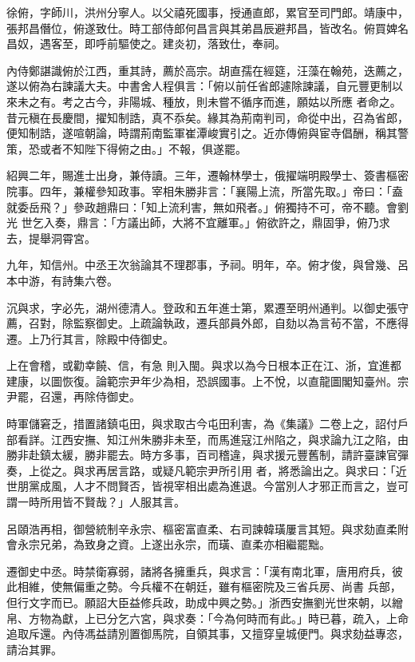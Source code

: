 \begin{pinyinscope}
 徐俯，字師川，洪州分寧人。以父禧死國事，授通直郎，累官至司門郎。靖康中，張邦昌僭位，俯遂致仕。時工部侍郎何昌言與其弟昌辰避邦昌，皆改名。俯買婢名昌奴，遇客至，即呼前驅使之。建炎初，落致仕，奉祠。



 內侍鄭諶識俯於江西，重其詩，薦於高宗。胡直孺在經筵，汪藻在翰苑，迭薦之，遂以俯為右諫議大夫。中書舍人程俱言：「俯以前任省郎遽除諫議，自元豐更制以來未之有。考之古今，非陽城、種放，則未嘗不循序而進，願姑以所應
 者命之。昔元稹在長慶間，擢知制誥，真不忝矣。緣其為荊南判司，命從中出，召為省郎，便知制誥，遂喧朝論，時謂荊南監軍崔潭峻實引之。近亦傳俯與宦寺倡酬，稱其警策，恐或者不知陛下得俯之由。」不報，俱遂罷。



 紹興二年，賜進士出身，兼侍讀。三年，遷翰林學士，俄擢端明殿學士、簽書樞密院事。四年，兼權參知政事。宰相朱勝非言：「襄陽上流，所當先取。」帝曰：「盍就委岳飛？」參政趙鼎曰：「知上流利害，無如飛者。」俯獨持不可，帝不聽。會劉光
 世乞入奏，鼎言：「方議出師，大將不宜離軍。」俯欲許之，鼎固爭，俯乃求去，提舉洞霄宮。



 九年，知信州。中丞王次翁論其不理郡事，予祠。明年，卒。俯才俊，與曾幾、呂本中游，有詩集六卷。



 沉與求，字必先，湖州德清人。登政和五年進士第，累遷至明州通判。以御史張守薦，召對，除監察御史。上疏論執政，遷兵部員外郎，自劾以為言茍不當，不應得遷。上乃行其言，除殿中侍御史。



 上在會稽，或勸幸饒、信，有急
 則入閩。與求以為今日根本正在江、浙，宜進都建康，以圖恢復。論範宗尹年少為相，恐誤國事。上不悅，以直龍圖閣知臺州。宗尹罷，召還，再除侍御史。



 時軍儲窘乏，措置諸鎮屯田，與求取古今屯田利害，為《集議》二卷上之，詔付戶部看詳。江西安撫、知江州朱勝非未至，而馬進寇江州陷之，與求論九江之陷，由勝非赴鎮太緩，勝非罷去。時方多事，百司稽違，與求援元豐舊制，請許臺諫官彈奏，上從之。與求再居言路，或疑凡範宗尹所引用
 者，將悉論出之。與求曰：「近世朋黨成風，人才不問賢否，皆視宰相出處為進退。今當別人才邪正而言之，豈可謂一時所用皆不賢哉？」人服其言。



 呂頤浩再相，御營統制辛永宗、樞密富直柔、右司諫韓璜屢言其短。與求劾直柔附會永宗兄弟，為致身之資。上遂出永宗，而璜、直柔亦相繼罷黜。



 遷御史中丞。時禁衛寡弱，諸將各擁重兵，與求言：「漢有南北軍，唐用府兵，彼此相維，使無偏重之勢。今兵權不在朝廷，雖有樞密院及三省兵房、尚書
 兵部，但行文字而已。願詔大臣益修兵政，助成中興之勢。」浙西安撫劉光世來朝，以繒帛、方物為獻，上已分乞六宮，與求奏：「今為何時而有此。」時已暮，疏入，上命追取斥還。內侍馮益請別置御馬院，自領其事，又擅穿皇城便門。與求劾益專恣，請治其罪。




\end{pinyinscope}
